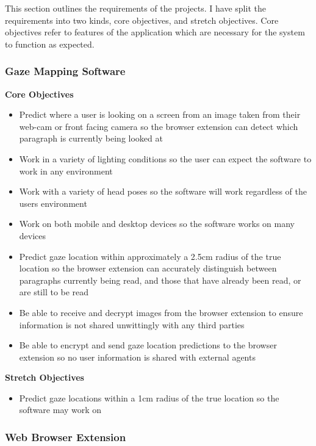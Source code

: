 \documentclass[twocolumn]{report}
\begin{document}
This section outlines the requirements of the projects. I have split the requirements into two kinds, core objectives, and stretch objectives. Core objectives refer to features of the application which are necessary for the system to function as expected. 
\subsubsection{Gaze Mapping Software}

\textbf{Core Objectives}
\begin{itemize}
    \item Predict where a user is looking on a screen from an image taken from their web-cam or front facing camera so the browser extension can detect which paragraph is currently being looked at  
    \item Work in a variety of lighting conditions so the user can expect the software to work in any environment
    \item Work with a variety of head poses so the software will work regardless of the users environment 
    \item Work on both mobile and desktop devices so the software works on many devices 
    \item Predict gaze location within approximately a 2.5cm radius of the true location so the browser extension can accurately distinguish between paragraphs currently being read, and those that have already been read, or are still to be read
    \item Be able to receive and decrypt images from the browser extension to ensure information is not shared unwittingly with any third parties  
    \item Be able to encrypt and send gaze location predictions to the browser extension so no user information is shared with external agents 
\end{itemize}

\textbf{Stretch Objectives}

\begin{itemize}
    \item Predict gaze locations within a 1cm radius of the true location so the software may work on 
\end{itemize}

\subsubsection{Web Browser Extension}
\end{document}
